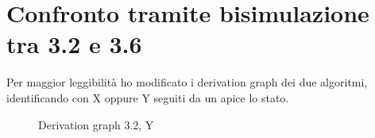 \documentclass[a4paper]{article}
\begin{document}
\section{Confronto tramite bisimulazione tra 3.2 e 3.6}
Per maggior leggibilità ho modificato i derivation graph dei due algoritmi, identificando con X oppure Y seguiti da un apice lo stato.\\
\begin{figure}[!ht]
\centering
{}
\caption{Derivation graph 3.2, Y} \label{FIG:3.2Eq}
\end{figure}\\
\end{document}
